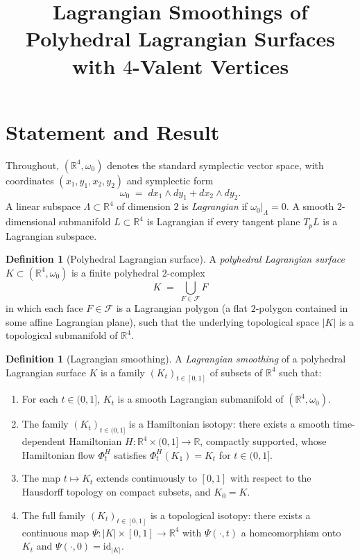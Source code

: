 \documentclass[12pt]{article}
\title{Lagrangian Smoothings of Polyhedral Lagrangian Surfaces \\ with $4$-Valent Vertices}
\author{}
\date{}
\theoremstyle{definition}
\newtheorem{definition}[theorem]{Definition}
\begin{document}
\maketitle

\section{Statement and Result}

Throughout, $(\mathbb{R}^4,\omega_0)$ denotes the standard symplectic vector space, with coordinates $(x_1,y_1,x_2,y_2)$ and symplectic form
\begin{equation}\label{eq:omega}
\omega_0 \;=\; dx_1\wedge dy_1 + dx_2\wedge dy_2.
\end{equation}
A linear subspace $\Lambda\subset\mathbb{R}^4$ of dimension $2$ is \emph{Lagrangian} if $\omega_0|_\Lambda=0$. A smooth $2$-dimensional submanifold $L\subset\mathbb{R}^4$ is Lagrangian if every tangent plane $T_pL$ is a Lagrangian subspace.

\begin{definition}[Polyhedral Lagrangian surface]\label{def:polyhedral}
A \emph{polyhedral Lagrangian surface} $K\subset(\mathbb{R}^4,\omega_0)$ is a finite polyhedral $2$-complex
\[
K \;=\; \bigcup_{F\in\mathcal{F}} F
\]
in which each face $F\in\mathcal{F}$ is a Lagrangian polygon (a flat $2$-polygon contained in some affine Lagrangian plane), such that the underlying topological space $|K|$ is a topological submanifold of $\mathbb{R}^4$.
\end{definition}

\begin{definition}[Lagrangian smoothing]\label{def:smoothing}
A \emph{Lagrangian smoothing} of a polyhedral Lagrangian surface $K$ is a family $(K_t)_{t\in[0,1]}$ of subsets of $\mathbb{R}^4$ such that:
\begin{enumerate}
\item For each $t\in(0,1]$, $K_t$ is a smooth Lagrangian submanifold of $(\mathbb{R}^4,\omega_0)$.
\item The family $(K_t)_{t\in(0,1]}$ is a Hamiltonian isotopy: there exists a smooth time-dependent Hamiltonian $H:\mathbb{R}^4\times(0,1]\to\mathbb{R}$, compactly supported, whose Hamiltonian flow $\Phi_t^H$ satisfies $\Phi_t^H(K_1)=K_t$ for $t\in(0,1]$.
\item The map $t\mapsto K_t$ extends continuously to $[0,1]$ with respect to the Hausdorff topology on compact subsets, and $K_0=K$.
\item The full family $(K_t)_{t\in[0,1]}$ is a topological isotopy: there exists a continuous map $\Psi:|K|\times[0,1]\to\mathbb{R}^4$ with $\Psi(\cdot,t)$ a homeomorphism onto $K_t$ and $\Psi(\cdot,0)=\mathrm{id}_{|K|}$.
\end{enumerate}
\end{definition}
\end{document}
